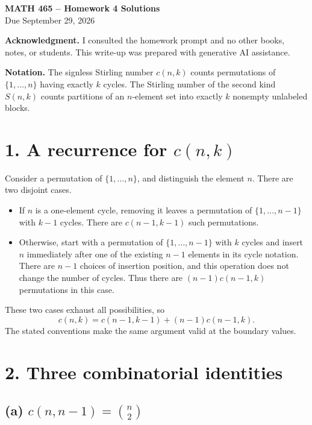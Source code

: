 \documentclass[11pt]{article}
\begin{document}
\begin{center}
    {\Large\bfseries MATH 465 -- Homework 4 Solutions}\\[4pt]
    Due September 29, 2026
\end{center}

\textbf{Acknowledgment.} I consulted the homework prompt and no other books,
notes, or students. This write-up was prepared with generative AI assistance.

\textbf{Notation.} The signless Stirling number \(c(n,k)\) counts permutations
of \(\{1,\ldots,n\}\) having exactly \(k\) cycles. The Stirling number of the
second kind \(S(n,k)\) counts partitions of an \(n\)-element set into exactly
\(k\) nonempty unlabeled blocks.

\section*{1. A recurrence for \(c(n,k)\)}

Consider a permutation of \(\{1,\ldots,n\}\), and distinguish the element
\(n\). There are two disjoint cases.

\begin{itemize}[leftmargin=2em]
    \item If \(n\) is a one-element cycle, removing it leaves a permutation of
    \(\{1,\ldots,n-1\}\) with \(k-1\) cycles. There are \(c(n-1,k-1)\) such
    permutations.
    \item Otherwise, start with a permutation of \(\{1,\ldots,n-1\}\) with
    \(k\) cycles and insert \(n\) immediately after one of the existing
    \(n-1\) elements in its cycle notation. There are \(n-1\) choices of
    insertion position, and this operation does not change the number of
    cycles. Thus there are \((n-1)c(n-1,k)\) permutations in this case.
\end{itemize}

These two cases exhaust all possibilities, so
\[
    c(n,k)=c(n-1,k-1)+(n-1)c(n-1,k).
\]
The stated conventions make the same argument valid at the boundary values.

\section*{2. Three combinatorial identities}

\subsection*{(a) \(c(n,n-1)=\binom{n}{2}\)}
\end{document}
